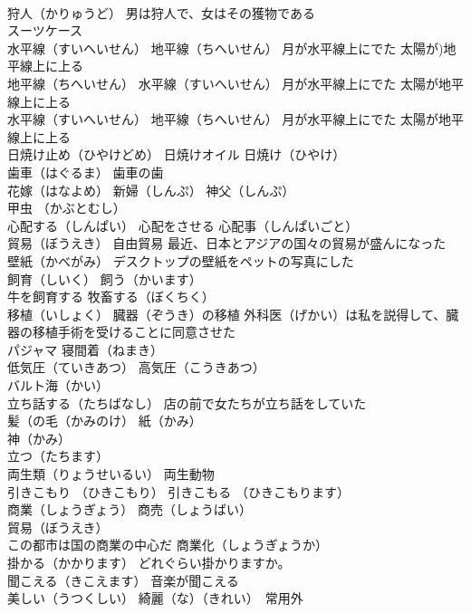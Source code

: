\documentclass[8pt]{extreport}
\begin{document}
\begin{CJK}{UTF8}{min}
\\	狩人（かりゅうど） 男は狩人で、女はその獲物である
\\	スーツケース
\\	水平線（すいへいせん） 地平線（ちへいせん） 月が水平線上にでた 太陽が)地平線上に上る 
\\	地平線（ちへいせん） 水平線（すいへいせん） 月が水平線上にでた 太陽が地平線上に上る 
\\	水平線（すいへいせん） 地平線（ちへいせん） 月が水平線上にでた 太陽が地平線上に上る
\\	日焼け止め（ひやけどめ） 日焼けオイル 日焼け（ひやけ）
\\	歯車（はぐるま） 歯車の歯
\\	花嫁（はなよめ） 新婦（しんぷ） 神父（しんぷ）
\\	甲虫 （かぶとむし）
\\	心配する（しんぱい） 心配をさせる 心配事（しんぱいごと）
\\	貿易（ぼうえき） 自由貿易 最近、日本とアジアの国々の貿易が盛んになった
\\	壁紙（かべがみ） デスクトップの壁紙をペットの写真にした
\\	飼育（しいく） 飼う（かいます）
\\	牛を飼育する 牧畜する（ぼくちく）
\\	移植（いしょく） 臓器（ぞうき）の移植 外科医（げかい）は私を説得して、臓器の移植手術を受けることに同意させた
\\	パジャマ 寝間着（ねまき）
\\	低気圧（ていきあつ） 高気圧（こうきあつ）
\\	バルト海（かい）
\\	立ち話する（たちばなし） 店の前で女たちが立ち話をしていた
\\	髪（の毛（かみのけ） 紙（かみ）
\\	神（かみ）
\\	立つ（たちます）
\\	両生類（りょうせいるい） 両生動物
\\	引きこもり （ひきこもり） 引きこもる （ひきこもります）
\\	商業（しょうぎょう） 商売（しょうばい）
\\	貿易（ぼうえき）
\\	この都市は国の商業の中心だ 商業化（しょうぎょうか）
\\	掛かる（かかります） どれぐらい掛かりますか。
\\	聞こえる（きこえます） 音楽が聞こえる
\\	美しい（うつくしい） 綺麗（な）（きれい）　常用外

\end{CJK}
\end{document}
